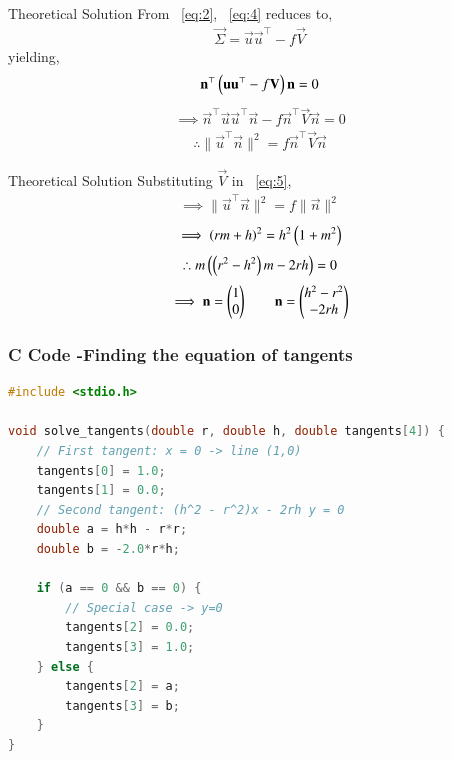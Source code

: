 \documentclass{beamer}
\begin{document}
\begin{frame}{Theoretical Solution}
From ~\eqref{eq:2}, ~\eqref{eq:4} reduces to,
\begin{align}
    \vec{\Sigma}=\vec{u}\vec{u}^{\top}-f\vec{V}
\end{align}
yielding,
\begin{align}
    \mathbf{n}^{\top}\left(\mathbf{u}\mathbf{u}^{\top}-f\mathbf{V}\right)\mathbf{n}=0
\end{align}
\begin{align}
    \implies \vec{n}^{\top}\vec{u}\vec{u}^{\top}\vec{n}-f\vec{n}^{\top}\vec{V}\vec{n}=0 
\end{align}
\begin{align}
    \therefore \|\vec{u}^{\top}\vec{n}\|^2=f\vec{n}^{\top}\vec{V}\vec{n} \label{eq:5}
\end{align}
\end{frame}

\begin{frame}{Theoretical Solution}
Substituting $\vec{V}$ in ~\eqref{eq:5},
\begin{align}
    \implies \|\vec{u}^{\top}\vec{n}\|^2=f\|\vec{n}\|^2
\end{align}
\begin{align}
    \implies \left(rm+h\right)^2=h^2\left(1+m^2\right)
\end{align}
\begin{align}
    \therefore m\left(\left(r^2-h^2\right)m-2rh\right)=0
\end{align}
\begin{align}
    \implies \mathbf{n}=\begin{pmatrix}1\\0\end{pmatrix} \qquad \mathbf{n}=\begin{pmatrix}h^2-r^2\\-2rh\end{pmatrix}
\end{align}
\end{frame}

\begin{frame}[fragile]
    \frametitle{C Code -Finding the equation of tangents}

    \begin{lstlisting}[language=C]
#include <stdio.h>

void solve_tangents(double r, double h, double tangents[4]) {
    // First tangent: x = 0 -> line (1,0)
    tangents[0] = 1.0;
    tangents[1] = 0.0;
    // Second tangent: (h^2 - r^2)x - 2rh y = 0
    double a = h*h - r*r;
    double b = -2.0*r*h;

    if (a == 0 && b == 0) {
        // Special case -> y=0
        tangents[2] = 0.0;
        tangents[3] = 1.0;
    } else {
        tangents[2] = a;
        tangents[3] = b;
    }
}
    \end{lstlisting}
\end{frame}
\end{document}
